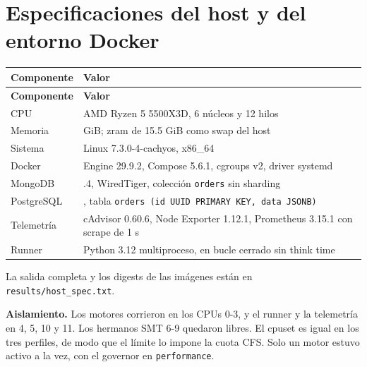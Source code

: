 \documentclass[11pt,letterpaper]{article}
\newcommand{\code}[1]{\texttt{#1}}
\begin{document}
\section{Especificaciones del host y del entorno Docker}

{\footnotesize\setlength{\tabcolsep}{3pt}
\begin{longtable}{>{\raggedright\arraybackslash}p{}>{\raggedright\arraybackslash}p{}}
\toprule
\textbf{Componente} & \textbf{Valor} \\
\midrule
\endfirsthead
\toprule
\textbf{Componente} & \textbf{Valor} \\
\midrule
\endhead
CPU & AMD Ryzen 5 5500X3D, 6 núcleos y 12 hilos \\
Memoria & 15 GiB; zram de 15.5 GiB como swap del host \\
Sistema & Linux 7.3.0-4-cachyos, x86\_64 \\
Docker & Engine 29.9.2, Compose 5.6.1, cgroups v2, driver systemd \\
MongoDB & 9.0.4, WiredTiger, colección \code{orders} sin sharding \\
PostgreSQL & 18.6, tabla \code{orders (id UUID PRIMARY KEY, data JSONB)} \\
Telemetría & cAdvisor 0.60.6, Node Exporter 1.12.1, Prometheus 3.15.1 con scrape de 1 s \\
Runner & Python 3.12 multiproceso, en bucle cerrado sin think time \\
\bottomrule
\end{longtable}}

La salida completa y los digests de las imágenes están en \code{results/\allowbreak{}host\_\allowbreak{}spec.\allowbreak{}txt}.

\textbf{Aislamiento.} Los motores corrieron en los CPUs 0-3, y el runner y la telemetría en 4, 5, 10 y 11. Los hermanos SMT 6-9 quedaron libres. El cpuset es igual en los tres perfiles, de modo que el límite lo impone la cuota CFS. Solo un motor estuvo activo a la vez, con el governor en \code{performance}.
\end{document}

